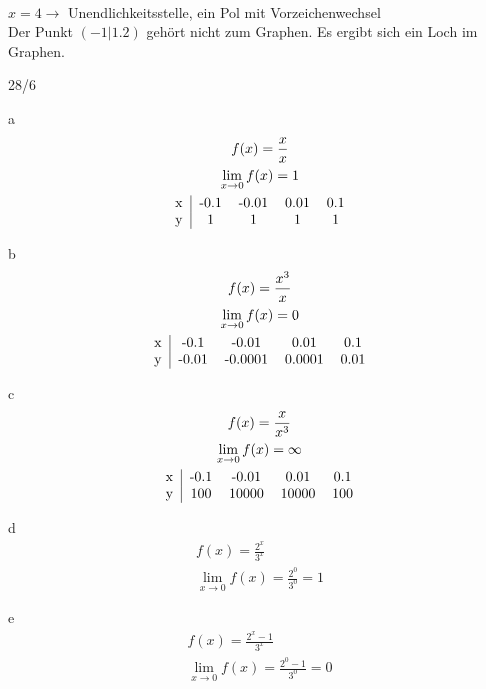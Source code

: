  \\
$x = 4 \rightarrow$ Unendlichkeitsstelle, ein Pol mit Vorzeichenwechsel \\
Der Punkt $(-1|1.2)$ gehört nicht zum Graphen. Es ergibt sich ein Loch im Graphen. 
\begin{exercise}{28/6}
  \item [a]
  \begin{gather*}
    f(x) = \frac{x}{x} \\
    \lim\limits_{x \to 0} f(x) = 1 \\
    \begin{tabular}{c|cccc}
      x & -0.1 & -0.01 & 0.01 & 0.1 \\
      y & 1 & 1 & 1 & 1 
    \end{tabular}
  \end{gather*}
  \item [b]
  \begin{gather*}
    f(x) = \frac{x^3}{x} \\
    \lim\limits_{x \to 0} f(x) = 0 \\
    \begin{tabular}{c|cccc}
      x & -0.1 & -0.01 & 0.01 & 0.1 \\
      y & -0.01 & -0.0001 & 0.0001 & 0.01 
    \end{tabular}
  \end{gather*}
  \item [c]
  \begin{gather*}
    f(x) = \frac{x}{x^3} \\
    \lim\limits_{x \to 0} f(x) = \infty \\
    \begin{tabular}{c|cccc}
      x & -0.1 & -0.01 & 0.01 & 0.1 \\
      y & 100 & 10000 & 10000 & 100 
    \end{tabular}
  \end{gather*}
  \item [d]
  \begin{gather*}
    f(x) = \frac{2^x}{3^x} \\
    \lim\limits_{x \to 0} f(x) = \frac{2^0}{3^0} = 1
  \end{gather*}
  \item [e]
  \begin{gather*}
    f(x) = \frac{2^x - 1}{3^x} \\
    \lim\limits_{x \to 0} f(x) = \frac{2^0 - 1}{3^0} = 0
  \end{gather*}
\end{exercise}

